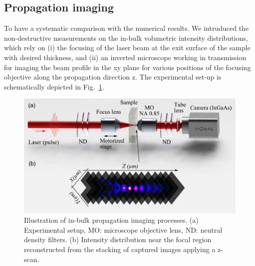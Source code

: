 \documentclass[9pt,twocolumn,twoside]{osajnl}
\begin{document}
\subsection{Propagation imaging}
To have a systematic comparison with the numerical results. We intruduced the non-destructive measurements on the in-bulk volumetric intensity distributions, which rely on (i) the focusing of the laser beam at the exit surface of the sample with desired thickness, and (ii) an inverted microscope working in transmission for imaging the beam profile in the xy plane for various positions of the focusing objective along the propagation direction z. The experimental set-up is schematically depicted in Fig.~\ref{fig:2}.
\begin{figure}
	\centering
	\includegraphics[width=\linewidth]{../AppOptics/figures/setup.pdf}
	\caption{Illustration of in-bulk propagation imaging processes. (a) Experimental setup, MO: microscope objective lens, ND: neutral density filters. (b) Intensity distribution near the focal region reconstructed from the stacking of captured images applying a z-scan.}\label{fig:2}
\end{figure}
\end{document}
